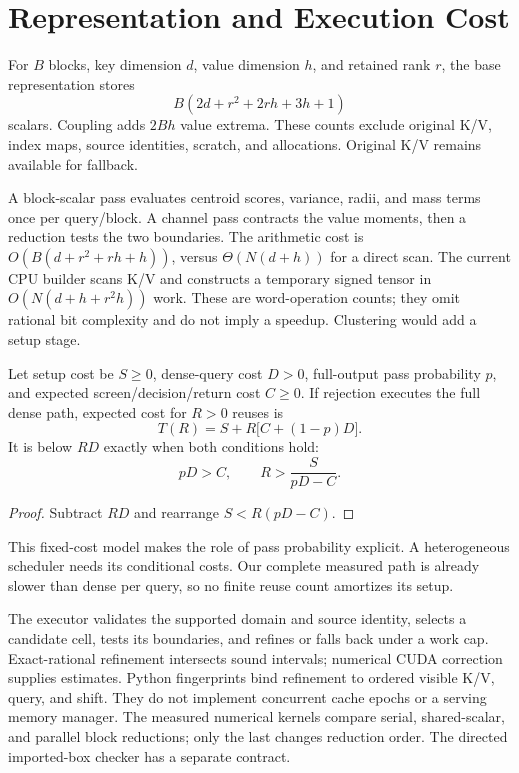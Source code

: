 \section{Representation and Execution Cost}
\label{sec:execution}

For $B$ blocks, key dimension $d$, value dimension $h$, and retained rank $r$,
the base representation stores
\begin{equation}
 B(2d+r^2+2rh+3h+1)
 \label{eq:storage}
\end{equation}
scalars. Coupling adds $2Bh$ value extrema. These counts exclude original K/V,
index maps, source identities, scratch, and allocations. Original K/V remains
available for fallback.

A block-scalar pass evaluates centroid scores, variance, radii, and mass
terms once per query/block. A channel pass contracts the value moments, then
a reduction tests the two boundaries. The arithmetic cost is
$O(B(d+r^2+rh+h))$, versus $\Theta(N(d+h))$ for a direct scan. The current
CPU builder scans K/V and constructs a temporary signed tensor in
$O(N(d+h+r^2h))$ work. These are word-operation counts; they omit rational bit
complexity and do not imply a speedup. Clustering would add a setup stage.

\begin{proposition}
\label{prop:reuse}
Let setup cost be $S\geq0$, dense-query cost $D>0$, full-output pass probability
$p$, and expected screen/decision/return cost $C\geq0$. If rejection executes
the full dense path, expected cost for $R>0$ reuses is
\begin{equation}
 T(R)=S+R\bigl[C+(1-p)D\bigr].
 \label{eq:reuse}
\end{equation}
It is below $RD$ exactly when both conditions hold:
\begin{equation*}
 pD>C,\qquad R>\frac{S}{pD-C}.
\end{equation*}
\end{proposition}
\begin{proof}
Subtract $RD$ and rearrange $S<R(pD-C)$.
\end{proof}

This fixed-cost model makes the role of pass probability explicit. A
heterogeneous scheduler needs its conditional costs. Our complete measured
path is already slower than dense per query, so no finite reuse count
amortizes its setup.

The executor validates the supported domain and source identity, selects a
candidate cell, tests its boundaries, and refines or falls back under a work
cap. Exact-rational refinement intersects sound intervals; numerical CUDA
correction supplies estimates. Python fingerprints bind refinement to ordered
visible K/V, query, and shift. They do not implement concurrent cache epochs
or a serving memory manager. The measured numerical kernels compare serial,
shared-scalar, and parallel block reductions; only the last changes reduction
order. The directed imported-box checker has a separate contract.
